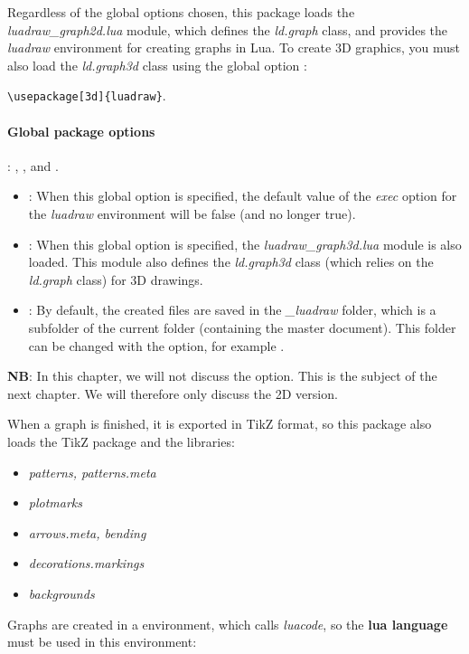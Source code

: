 Regardless of the global options chosen, this package loads the \emph{luadraw\_graph2d.lua} module, which defines the \emph{ld.graph} class, and provides the \emph{luadraw} environment for creating graphs in Lua. To create 3D graphics, you must also load the \emph{ld.graph3d} class using the global option : \par
\hfil\verb|\usepackage[3d]{luadraw}|.\hfil

\paragraph{Global package options}: , , and .

\begin{itemize}
\item {}: When this global option is specified, the default value of the \emph{exec} option for the \emph{luadraw} environment will be false (and no longer true).
\item {}: When this global option is specified, the \emph{luadraw\_graph3d.lua} module is also loaded. This module also defines the \emph{ld.graph3d} class (which relies on the \emph{ld.graph} class) for 3D drawings.
\item {}: By default, the created files are saved in the \emph{\_luadraw} folder, which is a subfolder of the current folder (containing the master document). This folder can be changed with the  option, for example .
\end{itemize}

\noindent\textbf{NB}: In this chapter, we will not discuss the  option. This is the subject of the next chapter. We will therefore only discuss the 2D version.

When a graph is finished, it is exported in TikZ format, so this package also loads the TikZ package and the libraries:
\begin{itemize}
    \item\emph{patterns, patterns.meta}
    \item\emph{plotmarks}
    \item\emph{arrows.meta, bending}
    \item\emph{decorations.markings}
    \item\emph{backgrounds}
\end{itemize}

Graphs are created in a \luadrawenv environment, which calls \emph{luacode}, so the \textbf{lua language} must be used in this environment:

